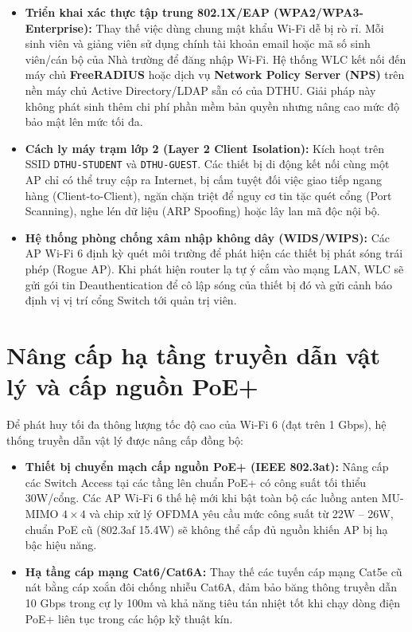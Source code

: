 \begin{itemize}
    \item \textbf{Triển khai xác thực tập trung 802.1X/EAP (WPA2/WPA3-Enterprise):} Thay thế việc dùng chung mật khẩu Wi-Fi dễ bị rò rỉ. Mỗi sinh viên và giảng viên sử dụng chính tài khoản email hoặc mã số sinh viên/cán bộ của Nhà trường để đăng nhập Wi-Fi. Hệ thống WLC kết nối đến máy chủ \textbf{FreeRADIUS} hoặc dịch vụ \textbf{Network Policy Server (NPS)} trên nền máy chủ Active Directory/LDAP sẵn có của DTHU. Giải pháp này không phát sinh thêm chi phí phần mềm bản quyền nhưng nâng cao mức độ bảo mật lên mức tối đa.
    \item \textbf{Cách ly máy trạm lớp 2 (Layer 2 Client Isolation):} Kích hoạt trên SSID \texttt{DTHU-STUDENT} và \texttt{DTHU-GUEST}. Các thiết bị di động kết nối cùng một AP chỉ có thể truy cập ra Internet, bị cấm tuyệt đối việc giao tiếp ngang hàng (Client-to-Client), ngăn chặn triệt để nguy cơ tin tặc quét cổng (Port Scanning), nghe lén dữ liệu (ARP Spoofing) hoặc lây lan mã độc nội bộ.
    \item \textbf{Hệ thống phòng chống xâm nhập không dây (WIDS/WIPS):} Các AP Wi-Fi 6 định kỳ quét môi trường để phát hiện các thiết bị phát sóng trái phép (Rogue AP). Khi phát hiện router lạ tự ý cắm vào mạng LAN, WLC sẽ gửi gói tin Deauthentication để cô lập sóng của thiết bị đó và gửi cảnh báo định vị vị trí cổng Switch tới quản trị viên.
\end{itemize}

\section{Nâng cấp hạ tầng truyền dẫn vật lý và cấp nguồn PoE+}

Để phát huy tối đa thông lượng tốc độ cao của Wi-Fi 6 (đạt trên 1 Gbps), hệ thống truyền dẫn vật lý được nâng cấp đồng bộ:
\begin{itemize}
    \item \textbf{Thiết bị chuyển mạch cấp nguồn PoE+ (IEEE 802.3at):} Nâng cấp các Switch Access tại các tầng lên chuẩn PoE+ có công suất tối thiểu 30W/cổng. Các AP Wi-Fi 6 thế hệ mới khi bật toàn bộ các luồng anten MU-MIMO $4\times 4$ và chip xử lý OFDMA yêu cầu mức công suất từ 22W -- 26W, chuẩn PoE cũ (802.3af 15.4W) sẽ không thể cấp đủ nguồn khiến AP bị hạ bậc hiệu năng.
    \item \textbf{Hạ tầng cáp mạng Cat6/Cat6A:} Thay thế các tuyến cáp mạng Cat5e cũ nát bằng cáp xoắn đôi chống nhiễu Cat6A, đảm bảo băng thông truyền dẫn 10 Gbps trong cự ly 100m và khả năng tiêu tán nhiệt tốt khi chạy dòng điện PoE+ liên tục trong các hộp kỹ thuật kín.
\end{itemize}

